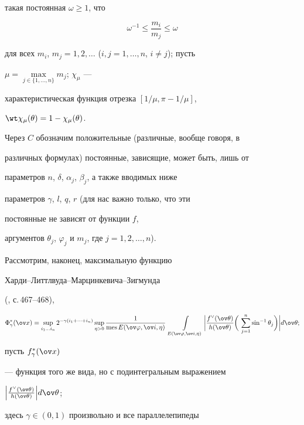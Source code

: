 такая постоянная $\omega\ge 1$, что 


\begin{equation} 


\omega^{-1}\le\frac{m_i}{m_j}\le\omega 


\end{equation} 


для всех $m_i$, $m_j=1,2,\dotsc$ ($i,j=1,\dotsc,n$, $i\ne j$); пусть 


$\mu=\max\limits_{j\in\{1,\dotsc,n\}}m_j$; $\chi_\mu$ --- 


характеристическая функция отрезка $[1/\mu,\pi-1/\mu]$, 


$\wt\chi_\mu(\theta)=1-\chi_\mu(\theta)$. 


Через $C$ обозначим положительные (различные, вообще говоря, в 


различных формулах) постоянные, зависящие, может быть, лишь от 


параметров $n$, $\delta$, $\alpha_j$, $\beta_j$, а также вводимых ниже 


параметров $\gamma$, $l$, $q$, $r$ (для нас важно только, что эти 


постоянные не зависят от функции $f$, 


аргументов $\theta_j$, $\varphi_j$ и $m_j$, где $j=1,2,\dotsc,n$). 


 


Рассмотрим, наконец, максимальную функцию 


Харди--Литтлвуда--Марцинкевича--Зигмунда 


(\cite{2}, с.\,467--468), 


$$ 


\Phi^*_\gamma(\ov x)=\sup_{i_1\dotsc i_n} 


2^{-\gamma(i_1+\dotsb+i_n)}\sup_{\eta>0} 


\frac{1}{\mes E(\ov\varphi,\ov i,\eta)}\; 


\intl_{E(\ov\varphi,\ov i,\eta)}\bigg| 


\frac{f^\vee(\ov\theta)}{h(\ov\theta)}\bigg(\, 


\sum^n_{j=1}\sin^{-1}\theta_j\bigg)\bigg|d\ov\theta; 


$$ 


пусть $f^*_\gamma(\ov x)$ 


--- функция того же вида, но с подинтегральным выражением 


$\Big|\frac{f^\vee(\ov\theta)}{h(\ov\theta)}\Big|d\ov\theta$; 


здесь $\gamma\in(0,1)$ произвольно и все параллелепипеды 


